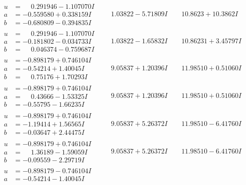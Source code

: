 \documentclass[1p]{elsarticle_modified}
\theoremstyle{definition}
\begin{document}
$$\begin{array}{c|c|c}
 \hline 
\begin{aligned}
u &= \phantom{-}0.291946 - 1.107070 I \\
a &= -0.559580 + 0.338159 I \\
b &= -0.680809 - 0.394835 I\end{aligned}
 & \phantom{-}1.03822 - 5.71809 I & \phantom{-}10.8623 + 10.3862 I \\ \hline\begin{aligned}
u &= \phantom{-}0.291946 - 1.107070 I \\
a &= -0.181802 - 0.034733 I \\
b &= \phantom{-}0.046374 - 0.759687 I\end{aligned}
 & \phantom{-}1.03822 - 1.65832 I & \phantom{-}10.86231 + 3.45797 I \\ \hline\begin{aligned}
u &= -0.898179 + 0.746104 I \\
a &= -0.54214 + 1.40045 I \\
b &= \phantom{-}0.75176 + 1.70293 I\end{aligned}
 & \phantom{-}9.05837 + 1.20396 I & \phantom{-}11.98510 + 0.51060 I \\ \hline\begin{aligned}
u &= -0.898179 + 0.746104 I \\
a &= \phantom{-}0.43666 - 1.53325 I \\
b &= -0.55795 - 1.66235 I\end{aligned}
 & \phantom{-}9.05837 + 1.20396 I & \phantom{-}11.98510 + 0.51060 I \\ \hline\begin{aligned}
u &= -0.898179 + 0.746104 I \\
a &= -1.19414 + 1.56565 I \\
b &= -0.03647 + 2.44475 I\end{aligned}
 & \phantom{-}9.05837 + 5.26372 I & \phantom{-}11.98510 - 6.41760 I \\ \hline\begin{aligned}
u &= -0.898179 + 0.746104 I \\
a &= \phantom{-}1.36189 - 1.59059 I \\
b &= -0.09559 - 2.29719 I\end{aligned}
 & \phantom{-}9.05837 + 5.26372 I & \phantom{-}11.98510 - 6.41760 I \\ \hline\begin{aligned}
u &= -0.898179 - 0.746104 I \\
a &= -0.54214 - 1.40045 I \\

\end{aligned}
\end{array}$$
\end{document}
